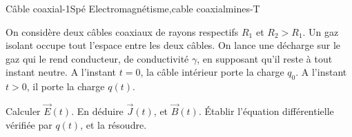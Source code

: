 \begin{exercise}{Câble coaxial}{-1}{Spé}
{Electromagnétisme,cable coaxial}{mines-T}

On considère deux câbles coaxiaux de rayons respectifs $R_1$ et $R_2 > R_1$. Un gaz isolant occupe tout l'espace entre les deux câbles. On lance une décharge sur le gaz qui le rend conducteur, de conductivité $\gamma$, en supposant qu'il reste à tout instant neutre. A l'instant $t=0$, la câble intérieur porte la charge $q_0$. A l'instant $t>0$, il porte la charge $q(t)$.

\begin{questions}
    \question Calculer $\vec{E}(t)$.
    \question En déduire $\vec{J}(t)$, et $\vec{B}(t)$.
    \question \'Etablir l'équation différentielle vérifiée par $q(t)$, et la résoudre.
\end{questions}

\end{exercise}
